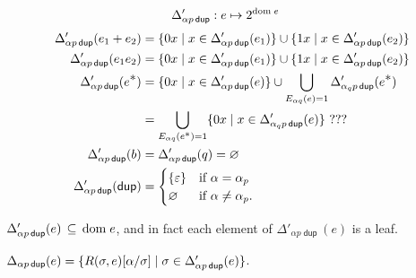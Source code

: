 \documentclass{article}
\newcommand\pdup{\mathop{\mathsf{dup}}}
\renewcommand\star{^{\textstyle *}}
\renewcommand\powerset[1]{2^{#1}}
\begin{document}
\begin{align*}
\Delta'_{\alpha p\pdup} &: e\mapsto\powerset{\dom e}
\end{align*}
\begin{align*}
\Delta'_{\alpha p\pdup}(e_1+e_2) &= \set{0x}{x\in\Delta'_{\alpha p\pdup}(e_1)} \cup \set{1x}{x\in\Delta'_{\alpha p\pdup}(e_2)}\\
\Delta'_{\alpha p\pdup}(e_1e_2) &= \set{0x}{x\in\Delta'_{\alpha p\pdup}(e_1)} \cup \set{1x}{x\in\Delta'_{\alpha p\pdup}(e_2)}\\
\Delta'_{\alpha p\pdup}(e\star) &= \set{0x}{x\in\Delta'_{\alpha p\pdup}(e)} \cup \bigcup_{E_{\alpha q}(e)=1}\Delta'_{\alpha_qp\pdup}(e\star)\\
&= \bigcup_{E_{\alpha q}(e^{\scriptstyle *})=1} \set{0x}{x\in\Delta'_{\alpha_qp\pdup}(e)}\ ???\\
\Delta'_{\alpha p\pdup}(b) &= \Delta'_{\alpha p\pdup}(q) = \emptyset\\
\Delta'_{\alpha p\pdup}(\pdup) &= \begin{cases}
\{\eps\} & \text{if $\alpha=\alpha_p$}\\
\emptyset & \text{if $\alpha\neq\alpha_p$.}
\end{cases}
\end{align*}

\begin{lemma}
\label{eq:Deltacl}
$\Delta'_{\alpha p\pdup}(e) \subs \dom e$, and in fact each element of $\Delta'_{\alpha p\pdup}(e)$ is a leaf.
\end{lemma}

\begin{lemma}
\label{eq:DDelta}
$\Delta_{\alpha p\pdup}(e) = \set{R(\sigma,e)\subst\alpha\sigma}{\sigma\in\Delta'_{\alpha p\pdup}(e)}$.
\end{lemma}
\end{document}
